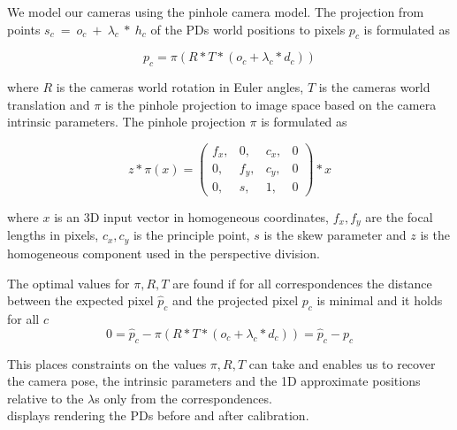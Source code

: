 We model our cameras using the pinhole camera model. 
The projection from points $s_c~=~o_c~+~\lambda_c~*~h_c$ of the PDs world positions to pixels $p_c$ is formulated as

\begin{equation}
  \label{eq:static_calibration_reprojection}
  p_c = \pi \left( R * T * (o_c + \lambda_c * d_c) \right)
\end{equation}

where $R$ is the cameras world rotation in Euler angles, $T$ is the cameras world translation and $\pi$ is the pinhole projection to image space based on the camera intrinsic parameters.
The pinhole projection $\pi$ is formulated as

\begin{equation}
  \label{eq:static_calibration_intrinsic_parameters}
  z * \pi(x) =   
  \begin{pmatrix}
    f_x,& 0,& c_x,& 0\\
    0,& f_y,& c_y,& 0\\
    0,& s,& 1 ,& 0
  \end{pmatrix} * x 
\end{equation}

where $x$ is an 3D input vector in homogeneous coordinates, $f_x, f_y$ are the focal lengths in pixels, $c_x, c_y$ is the principle point, $s$ is the skew parameter and $z$ is the homogeneous component used in the perspective division. 

The optimal values for $\pi,R,T$ are found if for all correspondences the distance between the expected pixel $\hat{p}_c$ and the projected pixel $p_c$ is minimal and it holds for all $c$
\begin{equation}
  0 = \hat{p}_c - \pi \left( R * T * (o_c + \lambda_c * d_c)\right) = \hat{p}_c - p_c
\end{equation}

This places constraints on the values $\pi,R,T$ can take and enables us to recover the camera pose, the intrinsic parameters and the 1D approximate positions relative to the $\lambda$s only from the correspondences.\\
 displays rendering the PDs before and after calibration.


